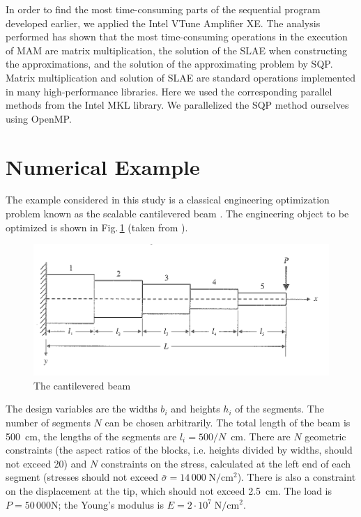 \documentclass[runningheads,a4paper]{llncs}
\begin{document}
In order to find the most time-consuming parts of the sequential program
developed earlier, we applied the Intel VTune Amplifier XE. The analysis
performed has shown that the most time-consuming operations in the execution of
MAM are matrix multiplication, the solution of the SLAE when constructing the
approximations, and the solution of the approximating problem by SQP. Matrix
multiplication and solution of SLAE are standard operations implemented in many
high-performance libraries. Here we used the corresponding parallel methods
from the Intel MKL library. We parallelized the SQP method ourselves using
OpenMP.

\section{Numerical Example}
\label{sec:num_example}

The example considered in this study is a classical engineering optimization
problem known as the scalable cantilevered beam \cite{Vanderpllaats2001}. The
engineering object to be optimized is shown in Fig.\,\ref{fig:beam} (taken from
\cite{Vanderpllaats2001}).

\begin{figure}[ht]
    \centering
    \includegraphics[width=1.0\textwidth]{beam.png}
    \caption{The cantilevered beam}
    \label{fig:beam}
\end{figure}

The design variables are the widths $b_i$ and heights $h_i$ of the segments.
The number of segments $N$ can be chosen arbitrarily. The total length of the
beam is 500~cm, the lengths of the segments are $l_i=500/N$~cm. There are $N$
geometric constraints (the aspect ratios of the blocks, i.e. heights divided by
widths, should not exceed 20) and $N$ constraints on the stress, calculated at
the left end of each segment (stresses should not exceed
$\bar{\sigma}=14\,000\;\text{N}/\text{cm}^2$). There is also a constraint on
the displacement at the tip, which should not exceed 2.5~cm. The load is $P =
50\,000$\;N; the Young's modulus is $E=2\cdot 10^7\;\text{N}/\text{cm}^2$.
\end{document}
